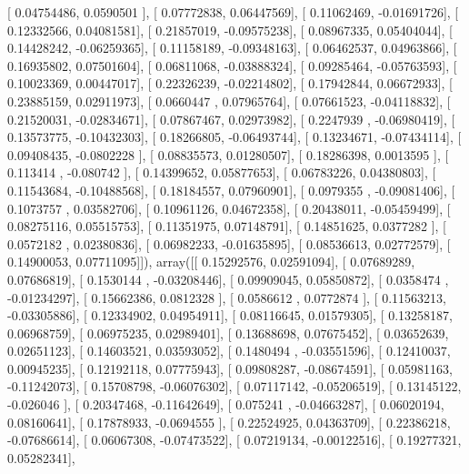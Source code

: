 \documentclass{article}
\begin{document}
       [ 0.04754486,  0.0590501 ],
       [ 0.07772838,  0.06447569],
       [ 0.11062469, -0.01691726],
       [ 0.12332566,  0.04081581],
       [ 0.21857019, -0.09575238],
       [ 0.08967335,  0.05404044],
       [ 0.14428242, -0.06259365],
       [ 0.11158189, -0.09348163],
       [ 0.06462537,  0.04963866],
       [ 0.16935802,  0.07501604],
       [ 0.06811068, -0.03888324],
       [ 0.09285464, -0.05763593],
       [ 0.10023369,  0.00447017],
       [ 0.22326239, -0.02214802],
       [ 0.17942844,  0.06672933],
       [ 0.23885159,  0.02911973],
       [ 0.0660447 ,  0.07965764],
       [ 0.07661523, -0.04118832],
       [ 0.21520031, -0.02834671],
       [ 0.07867467,  0.02973982],
       [ 0.2247939 , -0.06980419],
       [ 0.13573775, -0.10432303],
       [ 0.18266805, -0.06493744],
       [ 0.13234671, -0.07434114],
       [ 0.09408435, -0.0802228 ],
       [ 0.08835573,  0.01280507],
       [ 0.18286398,  0.0013595 ],
       [ 0.113414  , -0.080742  ],
       [ 0.14399652,  0.05877653],
       [ 0.06783226,  0.04380803],
       [ 0.11543684, -0.10488568],
       [ 0.18184557,  0.07960901],
       [ 0.0979355 , -0.09081406],
       [ 0.1073757 ,  0.03582706],
       [ 0.10961126,  0.04672358],
       [ 0.20438011, -0.05459499],
       [ 0.08275116,  0.05515753],
       [ 0.11351975,  0.07148791],
       [ 0.14851625,  0.0377282 ],
       [ 0.0572182 ,  0.02380836],
       [ 0.06982233, -0.01635895],
       [ 0.08536613,  0.02772579],
       [ 0.14900053,  0.07711095]]), array([[ 0.15292576,  0.02591094],
       [ 0.07689289,  0.07686819],
       [ 0.1530144 , -0.03208446],
       [ 0.09909045,  0.05850872],
       [ 0.0358474 , -0.01234297],
       [ 0.15662386,  0.0812328 ],
       [ 0.0586612 ,  0.0772874 ],
       [ 0.11563213, -0.03305886],
       [ 0.12334902,  0.04954911],
       [ 0.08116645,  0.01579305],
       [ 0.13258187,  0.06968759],
       [ 0.06975235,  0.02989401],
       [ 0.13688698,  0.07675452],
       [ 0.03652639,  0.02651123],
       [ 0.14603521,  0.03593052],
       [ 0.1480494 , -0.03551596],
       [ 0.12410037,  0.00945235],
       [ 0.12192118,  0.07775943],
       [ 0.09808287, -0.08674591],
       [ 0.05981163, -0.11242073],
       [ 0.15708798, -0.06076302],
       [ 0.07117142, -0.05206519],
       [ 0.13145122, -0.026046  ],
       [ 0.20347468, -0.11642649],
       [ 0.075241  , -0.04663287],
       [ 0.06020194,  0.08160641],
       [ 0.17878933, -0.0694555 ],
       [ 0.22524925,  0.04363709],
       [ 0.22386218, -0.07686614],
       [ 0.06067308, -0.07473522],
       [ 0.07219134, -0.00122516],
       [ 0.19277321,  0.05282341],
\end{document}
